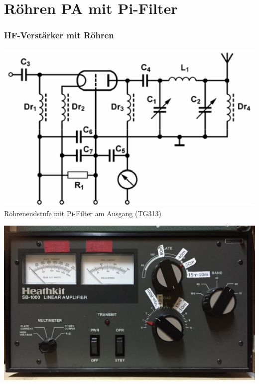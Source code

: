 

\subtitle{Technik A17: \\
           Schaltungstechnik \\[2em]}
\date{Stand 29.06.2016}


\section*{Röhren PA mit Pi-Filter}
\begin{frame}
    \frametitle{HF-Verstärker mit Röhren}
    \begin{center}
        \includegraphics[width=1\textwidth,height=.75\textheight,keepaspectratio]{a17/TG313.png}
        {\tiny \hyperlink{refs}{\cite{bna}}}\\
        Röhrenendstufe mit Pi-Filter am Ausgang (TG313)
    \end{center}
\end{frame}

\begin{frame}
  \begin{center}
    \includegraphics[width=\textwidth,height=.95\textheight,keepaspectratio]{a07/Heathkit.jpg}
    \tiny \hyperlink{refs}{\cite{dc4lw}}
  \end{center}
\end{frame}

